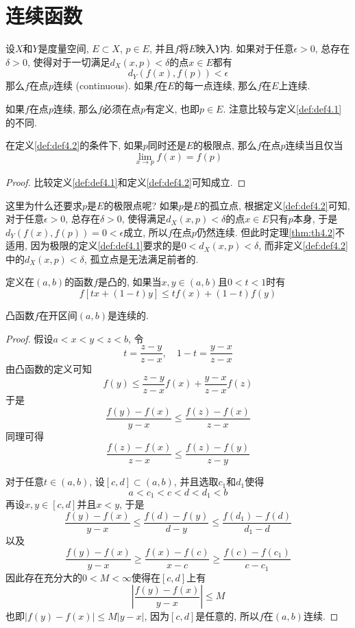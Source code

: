 \documentclass[cn,12pt,math=mtpro2,citestyle=gb7714-2015,bibstyle=gb7714-2015,twocol]{elegantbook}
\begin{document}
\section{连续函数}
\begin{definition}\label{def:def4.2}
设$X$和$Y$是度量空间, $E\subset X$, $p\in E$, 并且$f$将$E$映入$Y$内. 如果对于任意$\epsilon>0$, 总存在$\delta>0$, 使得对于一切满足$d_X(x,p)<\delta$的点$x\in E$都有
$$d_Y(f(x),f(p))<\epsilon$$
那么$f$在点$p$连续 (continuous). 如果$f$在$E$的每一点连续, 那么$f$在$E$上连续.
\end{definition}
\begin{remark}
如果$f$在点$p$连续, 那么$f$必须在点$p$有定义, 也即$p \in E$. 注意比较与定义\ref{def:def4.1}的不同.
\end{remark}
\begin{theorem}\label{thm:th4.2}
  在定义\ref{def:def4.2}的条件下, 如果$p$同时还是$E$的极限点, 那么$f$在点$p$连续当且仅当
$$\lim_{x\to p}f(x)=f(p)$$
\end{theorem}
\begin{proof}
  比较定义\ref{def:def4.1}和定义\ref{def:def4.2}可知成立.

\end{proof}
这里为什么还要求$p$是$E$的极限点呢? 如果$p$是$E$的孤立点, 根据定义\ref{def:def4.2}可知, 对于任意$\epsilon>0$, 总存在$\delta>0$, 使得满足$d_X(x,p)<\delta$的点$x\in E$只有$p$本身, 于是$d_Y(f(x),f(p))=0<\epsilon$成立, 所以$f$在点$p$仍然连续. 但此时定理\ref{thm:th4.2}不适用, 因为极限的定义\ref{def:def4.1}要求的是$0<d_X(x,p)<\delta$, 而非定义\ref{def:def4.2}中的$d_X(x,p)<\delta$, 孤立点是无法满足前者的.
\begin{definition}
定义在$(a,b)$的函数$f$是凸的, 如果当$x,y\in(a,b)$且$0<t<1$时有
\begin{equation}\label{eq4.12}
  f[tx+(1-t)y]\leq tf(x)+(1-t)f(y)
\end{equation}
\end{definition}
\begin{example}
凸函数$f$在开区间$(a,b)$是连续的.
\end{example}
\begin{proof}
  假设$a<x<y<z<b$, 令
  $$\displaystyle t=\frac{z-y}{z-x},\quad 1-t=\frac{y-x}{z-x}$$
  由凸函数的定义可知
  $$f(y)\leq \frac{z-y}{z-x}f(x)+\frac{y-x}{z-x}f(z)$$
  于是
  $$\frac{f(y)-f(x)}{y-x}\leq\frac{f(z)-f(x)}{z-x}$$
  同理可得
  $$\frac{f(z)-f(x)}{z-x}\leq\frac{f(z)-f(y)}{z-y}$$

 对于任意$t\in(a,b)$, 设$[c,d]\subset(a,b)$, 并且选取$c_1$和$d_1$使得
 $$a<c_1<c<d<d_1<b$$
 再设$x,y\in [c,d]$并且$x<y$, 于是
 $$\frac{f(y)-f(x)}{y-x}\leq\frac{f(d)-f(y)}{d-y}\leq\frac{f(d_1)-f(d)}{d_1-d}$$
 以及
 $$\frac{f(y)-f(x)}{y-x}\geq\frac{f(x)-f(c)}{x-c}\geq\frac{f(c)-f(c_1)}{c-c_1}$$
 因此存在充分大的$0<M<\infty$使得在$[c,d]$上有
 $$\left|\frac{f(y)-f(x)}{y-x}\right|\leq M$$
 也即$|f(y)-f(x)|\leq M|y-x|$, 因为$[c,d]$是任意的, 所以$f$在$(a,b)$连续.

\end{proof}
\end{document}
